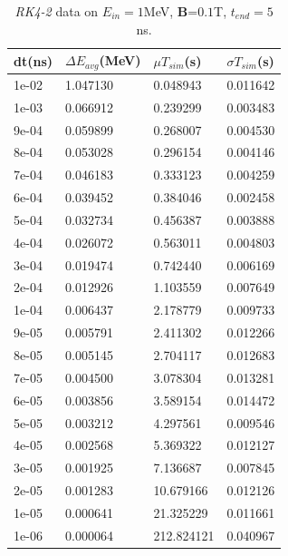 \documentclass[a4paper,oneside,12pt]{report}
\numberwithin{equation}{chapter}
\begin{document}
\begin{table}[H]
    \centering
    \caption{\textit{RK4-2} data on $E_{in}=1$MeV, \textbf{B}=$0.1$T, $t_{end}=5$ns.}
    \vspace{10pt}
    \begin{tabular}{|l|l|l|l|}
    \hline
    dt(ns)       & $\Delta E_{avg}$(MeV) & $\mu T_{sim}$(s)    & $\sigma T_{sim}$(s) \\\hline
        1e-02 & 1.047130     & 0.048943   & 0.011642 \\\hline
        1e-03 & 0.066912     & 0.239299   & 0.003483 \\\hline
        9e-04 & 0.059899     & 0.268007   & 0.004530 \\\hline
        8e-04 & 0.053028     & 0.296154   & 0.004146 \\\hline
        7e-04 & 0.046183     & 0.333123   & 0.004259 \\\hline
        6e-04 & 0.039452     & 0.384046   & 0.002458 \\\hline
        5e-04 & 0.032734     & 0.456387   & 0.003888 \\\hline
        4e-04 & 0.026072     & 0.563011   & 0.004803 \\\hline
        3e-04 & 0.019474     & 0.742440   & 0.006169 \\\hline
        2e-04 & 0.012926     & 1.103559   & 0.007649 \\\hline
        1e-04 & 0.006437     & 2.178779   & 0.009733 \\\hline
        9e-05 & 0.005791     & 2.411302   & 0.012266 \\\hline
        8e-05 & 0.005145     & 2.704117   & 0.012683 \\\hline
        7e-05 & 0.004500     & 3.078304   & 0.013281 \\\hline
        6e-05 & 0.003856     & 3.589154   & 0.014472 \\\hline
        5e-05 & 0.003212     & 4.297561   & 0.009546 \\\hline
        4e-05 & 0.002568     & 5.369322   & 0.012127 \\\hline
        3e-05 & 0.001925     & 7.136687   & 0.007845 \\\hline
        2e-05 & 0.001283     & 10.679166  & 0.012126 \\\hline
        1e-05 & 0.000641     & 21.325229  & 0.011661 \\\hline
        1e-06 & 0.000064     & 212.824121 & 0.040967 \\\hline
    \end{tabular}
    \label{tab:rk2_mag_table}
\end{table}
\end{document}
